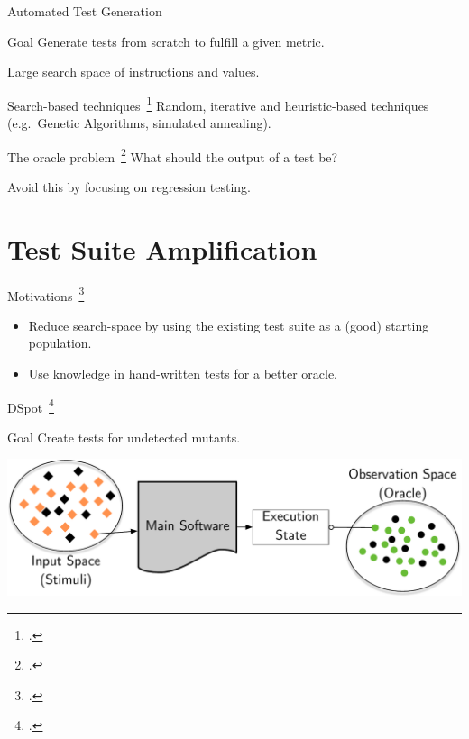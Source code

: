 \documentclass[aspectratio=169,dvipsnames]{beamer}
\begin{document}
\begin{frame}{Automated Test Generation}
  \begin{block}{Goal}
    Generate tests from scratch to fulfill a given metric.

    Large search space of instructions and values.
  \end{block}

  \begin{exampleblock}{Search-based techniques~\footcite{mcminn2011search}}
    Random, iterative and heuristic-based techniques (e.g.\ Genetic Algorithms, simulated annealing).
  \end{exampleblock}

  \pause{}

  \begin{block}{The oracle problem~\footcite{barr2015oracle}}
    What should the output of a test be?

    \textrightarrow{} Avoid this by focusing on regression testing.
  \end{block}
\end{frame}


\section{Test Suite Amplification}

\begin{frame}{Motivations~\footcite{danglot2017emerging}}
  \begin{itemize}
    \item Reduce search-space by using the existing test suite as a (good) starting population.
    \item Use knowledge in hand-written tests for a better oracle.
  \end{itemize}
\end{frame}

\begin{frame}{DSpot~\footcite{baudry2015dspot}}
  \begin{block}{Goal}
    Create tests for undetected mutants.
  \end{block}
  \begin{center}
    \includegraphics[scale=0.5]{spaces_report}
  \end{center}
\end{frame}
\end{document}
